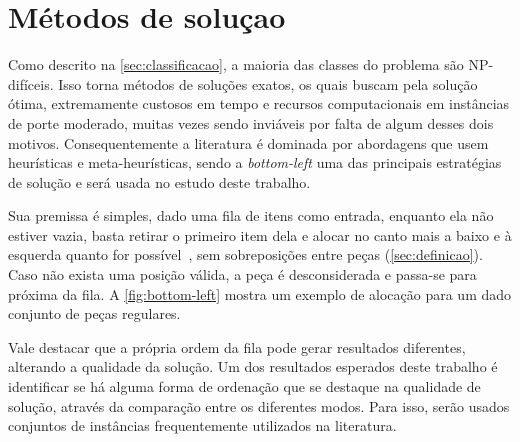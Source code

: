 \chapter{Métodos de soluçao}\label{ch:bottom-left}

Como descrito na \autoref{sec:classificacao}, a maioria das classes do problema são NP-difíceis.
Isso torna métodos de soluções exatos, os quais buscam pela solução ótima, extremamente custosos
em tempo e recursos computacionais em instâncias de porte moderado, muitas vezes sendo inviáveis
por falta de algum desses dois motivos.
Consequentemente a literatura é dominada por abordagens que usem heurísticas e meta-heurísticas,
sendo a \textit{bottom-left} uma das principais estratégias de solução e será usada no estudo
deste trabalho.



Sua premissa é simples, dado uma fila de itens como entrada, enquanto ela não estiver vazia,
basta retirar o primeiro item dela e alocar no canto mais a baixo e à esquerda quanto for
possível~\cite{aprendizado-reforco}, sem sobreposições entre peças (\autoref{sec:definicao}).
Caso não exista uma posição válida, a peça é desconsiderada e passa-se para próxima da fila.
A \autoref{fig:bottom-left} mostra um exemplo de alocação para um dado conjunto de peças regulares.

Vale destacar que a própria ordem da fila pode gerar resultados diferentes, alterando a qualidade
da solução.
Um dos resultados esperados deste trabalho é identificar se há alguma forma de ordenação que
se destaque na qualidade de solução, através da comparação entre os diferentes modos.
Para isso, serão usados conjuntos de instâncias frequentemente utilizados na literatura.



